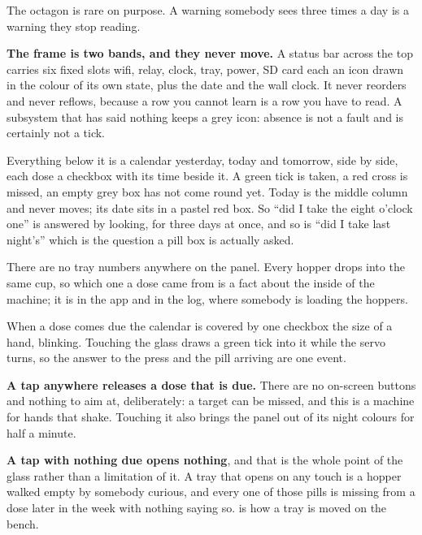 \documentclass[11pt]{article}
\begin{document}
\vspace{1mm}
\noindent The octagon is rare on purpose. A warning somebody sees three times a
day is a warning they stop reading.

\vspace{2mm}
\noindent\textbf{\sffamily The frame is two bands, and they never move.} A
status bar across the top carries six fixed slots \textemdash{} wifi, relay,
clock, tray, power, SD card \textemdash{} each an icon drawn in the colour of its
own state, plus the date and the wall clock. It never reorders and never
reflows, because a row you cannot learn is a row you have to read. A subsystem
that has said nothing keeps a grey icon: absence is not a fault and is certainly
not a tick.

Everything below it is a calendar \textemdash{} yesterday, today and tomorrow,
side by side, each dose a checkbox with its time beside it. A green tick is
taken, a red cross is missed, an empty grey box has not come round yet. Today is
the middle column and never moves; its date sits in a pastel red box. So ``did I
take the eight o'clock one'' is answered by looking, for three days at once, and
so is ``did I take last night's'' \textemdash{} which is the question a pill box
is actually asked.

There are no tray numbers anywhere on the panel. Every hopper drops into the
same cup, so which one a dose came from is a fact about the inside of the
machine; it is in the app and in the log, where somebody is loading the hoppers.

When a dose comes due the calendar is covered by one checkbox the size of a
hand, blinking. Touching the glass draws a green tick into it while the servo
turns, so the answer to the press and the pill arriving are one event.

\vspace{2mm}
\noindent\textbf{\sffamily A tap anywhere releases a dose that is due.} There are
no on-screen buttons and nothing to aim at, deliberately: a target can be missed,
and this is a machine for hands that shake. Touching it also brings the panel
out of its night colours for half a minute.

\vspace{1mm}
\noindent\textbf{\sffamily A tap with nothing due opens nothing}, and that is
the whole point of the glass rather than a limitation of it. A tray that opens
on any touch is a hopper walked empty by somebody curious, and every one of
those pills is missing from a dose later in the week with nothing saying so.
 is how a tray is moved on the bench.
\end{document}
